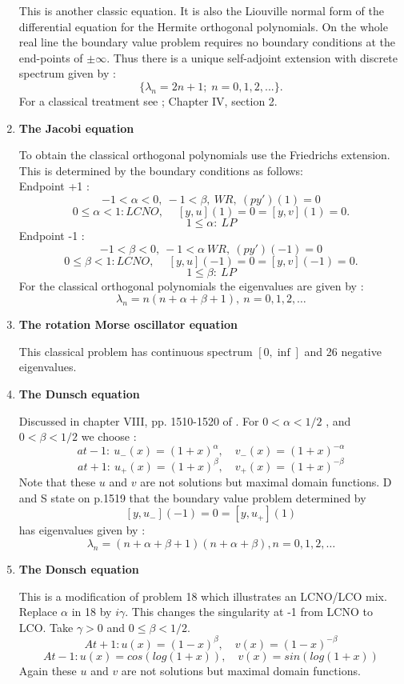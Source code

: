 \begin{enumerate}
This is another classic equation. It is also the
Liouville normal form of the differential equation for the Hermite
orthogonal polynomials. On the whole real line the boundary value
problem requires no boundary conditions at the end-points of $\pm \infty
$. Thus there is a unique self-adjoint extension with discrete spectrum given by : 
$$ \{ \lambda_n = 2n+1 ; \; n=0,
1,2,...\}. $$
For a classical treatment see \cite{T}; Chapter IV, section 2.
\item %
{\bf The Jacobi equation}

To obtain the classical orthogonal polynomials use the Friedrichs extension. This 
is determined by the boundary conditions as follows: \\
Endpoint +1 :  $$ -1 < \alpha < 0,  \ -1 < \beta, \ WR,  \ (py')(1) =0 $$  
$$ 0 \le \alpha < 1 : LCNO, 
\quad \ [y,u](1) = 0 = [y,v](1) =0. $$
$$ 1 \le \alpha : \ LP $$
Endpoint -1 :  $$ -1 < \beta  < 0,  \ -1 < \alpha \ WR,  \ (py')(-1) =0 $$  
$$ 0 \le \beta  < 1 : LCNO, 
\quad \ [y,u](-1) = 0 = [y,v](-1) =0. $$
$$ 1 \le \beta  : \ LP $$
For the classical orthogonal polynomials the eigenvalues are given by : 
$$
\lambda_n = n(n + \alpha + \beta + 1), \ n = 0,1,2, \ldots 
$$

\item %
{\bf The rotation Morse oscillator equation}

This classical problem has continuous spectrum $[0, \inf ]$ and 26 negative 
eigenvalues.

\item %
{\bf The Dunsch equation}

Discussed in chapter VIII, pp. 1510-1520 of \cite{DS}. For $ 0 < \alpha < 1/2 $ , 
and $0 < \beta < 1/2$ we choose : \\
$$
at -1 : \ u_-(x) = (1 + x)^{\alpha}, \quad v_-(x) = (1+x)^{-\alpha}
$$
$$
at +1 : \ u_+(x) = (1 + x)^{\beta }, \quad v_+(x) = (1+x)^{-\beta}
$$
Note that these $u$ and $v$ are not solutions but maximal domain functions. D and S
state on p.1519 that the boundary value problem determined by  
$$
[y,u_-](-1) = 0 = [y,u_+](1)
$$
has eigenvalues given by :
$$
\lambda_n = (n + \alpha + \beta + 1)(n + \alpha + \beta), n = 0, 1, 2, \ldots 
$$

\item %
{\bf The Donsch equation}

This is a modification of problem 18 which illustrates an LCNO/LCO mix. Replace 
$\alpha$ in 18 by $ i \gamma$. This changes the singularity at -1 from LCNO to 
LCO. Take $\gamma > 0$ and $ 0 \le \beta < 1/2 $. 
$$
At +1 : u(x) = (1-x)^{\beta}, \quad v(x) = (1-x)^{-\beta} 
$$
$$
At -1 : u(x) = cos(log(1+x)), \quad v(x) = sin(log(1+x)) 
$$
Again these $u$ and $v$ are not solutions but maximal domain functions.


\end{enumerate}
